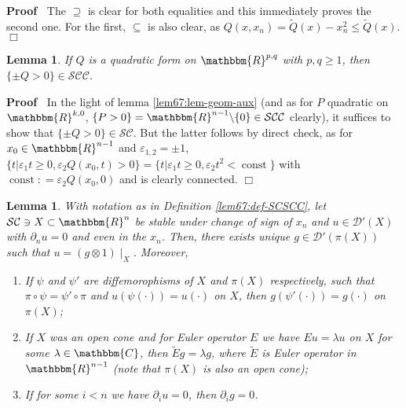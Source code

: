 \documentclass[12pt]{article}
\newcommand{\tmop}[1]{\ensuremath{\operatorname{#1}}}
\renewenvironment{proof}{\noindent\textbf{Proof\ }}{\hspace*{\fill}$\Box$\medskip}
\newtheorem{lemma}[proposition]{Lemma}
\theoremstyle{remark}
\begin{document}
\begin{proof}
  The $\supseteq$ is clear for both equalities and this immediately proves the
  second one. For the first, $\subseteq$ is also clear, as $Q (x, x_n) =
  \tilde{Q} (x) - x_n^2 \leqslant \tilde{Q} (x)$.
\end{proof}

\begin{lemma}
  \label{lem67:lem-geom}If $Q$ is a quadratic form on $\mathbbm{R}^{p, q}$
  with $p, q \geqslant 1$, then $\{ \pm Q > 0 \} \in
  \mathcal{S}\mathcal{C}\mathcal{C}$.
\end{lemma}

\begin{proof}
  In the light of lemma \ref{lem67:lem-geom-aux} (and as for $P$ quadratic on
  $\mathbbm{R}^{k, 0}$, $\{ P > 0 \} =\mathbbm{R}^{n - 1} \backslash \{ 0 \}
  \in \mathcal{S}\mathcal{C}\mathcal{C}$ clearly), it suffices to show that
  $\{ \pm Q > 0 \} \in \mathcal{S}\mathcal{C}$. But the latter follows by
  direct check, as for $x_0 \in \mathbbm{R}^{n - 1}$ and $\varepsilon_{1, 2} =
  \pm 1$, $\{ t | \varepsilon_1 t \geqslant 0, \varepsilon_2 Q (x_0, t) > 0 \}
  = \{ t | \varepsilon_1 t \geqslant 0, \varepsilon_2 t^2 < \tmop{const} \}$
  with $\tmop{const} : = \varepsilon_2 Q (x_0, 0)$ and is clearly connected.
\end{proof}

\begin{lemma}
	\label{lem67:lem-tensor-aux}With notation as in Definition \ref{lem67:def-SCSCC}, let $\mathcal{S}\mathcal{C} \ni X \subset
  \mathbbm{R}^n$ be stable under change of sign of $x_n$ and $u \in
  \mathcal{D}' (X)$ with $\partial_n u = 0$ and even in the $x_n$. Then, there
  exists unique $g \in \mathcal{D}' (\pi (X))$ such that $u = (g \otimes 1)
  \mid_X$. Moreover,
  \begin{enumerate}
    \item If $\psi$ and $\psi'$ are diffemorophisms of $X$ and $\pi (X)$
    respectively, such that $\pi \circ \psi = \psi' \circ \pi$ and $u (\psi
    (\cdot)) = u (\cdot)$ on $X$, then $g (\psi' (\cdot)) = g (\cdot)$ on $\pi
    (X)$;
    
    \item If $X$ was an open cone and for Euler operator $E$ we have $E u =
    \lambda u$ on $X$ for some $\lambda \in \mathbbm{C}$, then $\tilde{E} g =
    \lambda g$, where $\tilde{E}$ is Euler operator in $\mathbbm{R}^{n - 1}$
    (note that $\pi (X)$ is also an open cone);
    
    \item If for some $i < n$ we have $\partial_i u = 0$, then $\partial_i g =
    0$.
  \end{enumerate}
\end{lemma}
\end{document}
